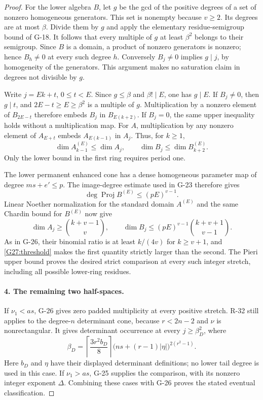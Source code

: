 \begin{proof}
For the lower algebra $B$, let $g$ be the gcd of the positive
degrees of a set of nonzero homogeneous generators. This
set is nonempty because $v\ge2$. Its degrees are at most
$\beta$. Divide them by $g$ and apply the elementary
residue-semigroup bound of G-18. It follows that every
multiple of $g$ at least $\beta^2$ belongs to their semigroup.
Since $B$ is a domain, a product of nonzero generators is
nonzero; hence $B_h\ne0$ at every such degree $h$.
Conversely $B_j\ne0$ implies $g\mid j$, by homogeneity of
the generators. This argument makes no saturation claim in
degrees not divisible by $g$.

Write $j=Ek+t$, $0\le t<E$. Since $g\le\beta$ and
$\beta!\mid E$, one has $g\mid E$. If $B_j\ne0$, then
$g\mid t$, and $2E-t\ge E\ge\beta^2$ is a multiple of
$g$. Multiplication by a nonzero element of $B_{2E-t}$
therefore embeds $B_j$ in $B_{E(k+2)}$. If $B_j=0$, the
same upper inequality holds without a multiplication map.
For $A$, multiplication by any nonzero element of
$A_{E+t}$ embeds $A_{E(k-1)}$ in $A_j$. Thus, for $k\ge1$,
\begin{equation}\label{G27:one_sided_sandwich}
 \dim A^{(E)}_{k-1}\le\dim A_j,\qquad
 \dim B_j\le\dim B^{(E)}_{k+2}.
\end{equation}
Only the lower bound in the first ring requires period one.

The lower permanent enhanced cone has a dense homogeneous
parameter map of degree $ms+e'\le p$. The image-degree
estimate used in G-23 therefore gives
\[
             \deg\operatorname{Proj}B^{(E)}\le(pE)^{v-1}.
\]
Linear Noether normalization for the standard domain
$A^{(E)}$ and the same Chardin bound for $B^{(E)}$ now give
\[
 \dim A_j\ge\binom{k+v-1}{v},\qquad
 \dim B_j\le(pE)^{v-1}\binom{k+v+1}{v-1}.
\]
As in G-26, their binomial ratio is at least $k/(4v)$ for
$k\ge v+1$, and \eqref{G27:threshold} makes the first
quantity strictly larger than the second. The Pieri upper
bound proves the desired strict comparison at every such
integer stretch, including all possible lower-ring residues.

\paragraph{4. The remaining two half-spaces.}
If $\nu_1<as$, G-26 gives zero padded multiplicity at every
positive stretch. R-32 still applies to the degree-$n$
determinant cone, because $r<2n-2$ and $\nu$ is nonrectangular.
It gives determinant occurrence at every
$j\ge\beta_D^2$, where
\[
 \beta_D=\left\lceil\frac{3r^2b_D}{8}\right\rceil
             \bigl(ns+(r-1)|\eta|\bigr)^{2(r^2-1)}.
\]
Here $b_D$ and $\eta$ have their displayed determinant
definitions; no lower tail degree is used in this case.
If $\nu_1>as$, G-25 supplies the comparison, with its
nonzero integer exponent $\Delta$. Combining these cases
with G-26 proves the stated eventual classification.
\end{proof}

